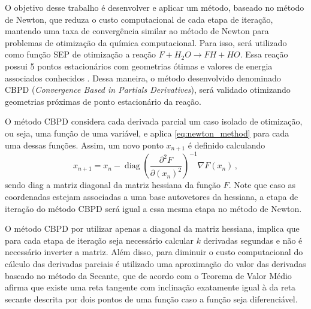 \documentclass{pssbmac}
\DeclareMathOperator{\diag}{diag}
\begin{document}
O objetivo desse trabalho é desenvolver e aplicar um método, baseado no método de Newton, que reduza o custo computacional de cada etapa de iteração, mantendo uma taxa de convergência similar ao método de Newton para problemas de otimização da química computacional. Para isso, será utilizado como função SEP \cite{fh2o_sep_fortran_module} de otimização a reação $F + H_2O \to FH + HO$. Essa reação possui 5 pontos estacionários com geometrias ótimas e valores de energia associados conhecidos \cite{fh2o_first_sep}. Dessa maneira, o método desenvolvido denominado CBPD (\textit{Convergence Based in Partials Derivatives}), será validado otimizando geometrias próximas de ponto estacionário da reação.

O método CBPD considera cada derivada parcial um caso isolado de otimização, ou seja, uma função de uma variável, e aplica \eqref{eq:newton_method} para cada uma dessas funções. Assim, um novo ponto $x_{n+1}$ é definido calculando
%
\begin{equation}
  x_{n+1} = x_n - \diag{\left(\frac{\partial^2 F}{\partial (x_{n})^2 }\right)}^{-1} \nabla F(x_n) \,,
  \label{eq:cbpd_method}
\end{equation}
%
sendo diag a matriz diagonal da matriz hessiana da função $F$. Note que caso as coordenadas estejam associadas a uma base autovetores da hessiana, a etapa de iteração do método CBPD será igual a essa mesma etapa no método de Newton.

O método CBPD por utilizar apenas a diagonal da matriz hessiana, implica que para cada etapa de iteração seja necessário calcular $k$ derivadas segundas e não é necessário inverter a matriz. Além disso, para diminuir o custo computacional do cálculo das derivadas parciais é utilizado uma aproximação do valor das derivadas baseado no método da Secante, que de acordo com o Teorema de Valor Médio \cite{calculo_1} afirma que existe uma reta tangente com inclinação exatamente igual à da reta secante descrita por dois pontos de uma função caso a função seja diferenciável.
\end{document}
